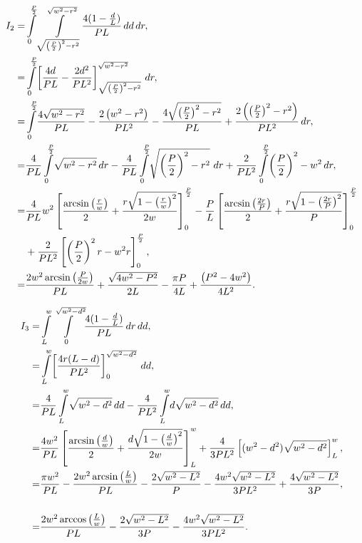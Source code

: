 \begin{align*}
I_{2}= & \intop_{0}^{\frac{P}{2}}\intop_{\sqrt{\left(\frac{P}{2}\right)^{2}-r^{2}}}^{\sqrt{w^{2}-r^{2}}}\!\frac{4(1-\frac{d}{L})}{PL}\, dd\, dr,\\
= & \intop_{0}^{\frac{P}{2}}\!\left[\frac{4d}{PL}-\frac{2d^{2}}{PL^{2}}\right]_{\sqrt{\left(\frac{P}{2}\right)^{2}-r^{2}}}^{\sqrt{w^{2}-r^{2}}}\, dr,\\
= & \intop_{0}^{\frac{P}{2}}\!\frac{4\sqrt{w^{2}-r^{2}}}{PL}-\frac{2\left(w^{2}-r^{2}\right)}{PL^{2}}-\frac{4\sqrt{\left(\frac{P}{2}\right)^{2}-r^{2}}}{PL}+\frac{2\left(\left(\frac{P}{2}\right)^{2}-r^{2}\right)}{PL^{2}}\, dr,\\
= & \frac{4}{PL}\intop_{0}^{\frac{P}{2}}\!\sqrt{w^{2}-r^{2}}\, dr-\frac{4}{PL}\intop_{0}^{\frac{P}{2}}\!\sqrt{\left(\frac{P}{2}\right)^{2}-r^{2}}\,\, dr+\frac{2}{PL^{2}}\intop_{0}^{\frac{P}{2}}\!\left(\frac{P}{2}\right)^{2}-w^{2}\, dr,\\
= & \frac{4}{PL}w^{2}\left[\frac{\arcsin\left(\frac{r}{w}\right)}{2}+\frac{r\sqrt{1-\left(\frac{r}{w}\right)^{2}}}{2w}\right]_{0}^{\frac{P}{2}}-\frac{P}{L}\left[\frac{\arcsin\left(\frac{2r}{P}\right)}{2}+\frac{r\sqrt{1-\left(\frac{2r}{P}\right)^{2}}}{P}\right]_{0}^{\frac{P}{2}}\\
& +\frac{2}{PL^{2}}\left[\left(\frac{P}{2}\right)^{2}r-w^{2}r\right]_{0}^{\frac{P}{2}},\\
= & \frac{2w^{2}\arcsin\left(\frac{P}{2w}\right)}{PL}+\frac{\sqrt{4w^{2}-P^{2}}}{2L}-\frac{\pi P}{4L}+\frac{\left(P^{2}-4w^{2}\right)}{4L^{2}}.\end{align*}


\begin{align*}
I_{3}= & \intop_{L}^{w}\intop_{0}^{\sqrt{w^{2}-d^{2}}}\!\frac{4(1-\frac{d}{L})}{PL}\, dr\, dd,\\
= & \intop_{L}^{w}\!\left[\frac{4r(L-d)}{PL^{2}}\right]_{0}^{\sqrt{w^{2}-d^{2}}}\, dd,\\
= & \frac{4}{PL}\intop_{L}^{w}\!\sqrt{w^{2}-d^{2}}\, dd-\frac{4}{PL^{2}}\intop_{L}^{w}\! d\sqrt{w^{2}-d^{2}}\, dd,\\
= & \frac{4w^{2}}{PL}\left[\frac{\arcsin\left(\frac{d}{w}\right)}{2}+\frac{d\sqrt{1-\left(\frac{d}{w}\right)^{2}}}{2w}\right]_{L}^{w}+\frac{4}{3PL^{2}}\left[(w^{2}-d^{2})\sqrt{w^{2}-d^{2}}\right]_{L}^{w},\\
= & \frac{\pi w^{2}}{PL}-\frac{2w^{2}\arcsin\left(\frac{L}{w}\right)}{PL}-\frac{2\sqrt{w^{2}-L^{2}}}{P}-\frac{4w^{2}\sqrt{w^{2}-L^{2}}}{3PL^{2}}+\frac{4\sqrt{w^{2}-L^{2}}}{3P},\\
\\= & \frac{2w^{2}\arccos\left(\frac{L}{w}\right)}{PL}-\frac{2\sqrt{w^{2}-L^{2}}}{3P}-\frac{4w^{2}\sqrt{w^{2}-L^{2}}}{3PL^{2}}.\end{align*}

